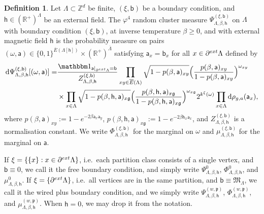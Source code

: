 \documentclass[11pt,a4paper]{article}
\theoremstyle{definition}
\newtheorem{definition}[theorem]{Definition}
\numberwithin{equation}{section}
\newcommand\fg{\mathfrak{g}}
\begin{document}
\begin{definition} \label{def: random cluster phi4}
Let $\Lambda \subset \mathbb Z^d$ be finite, $(\xi,\mathsf{b})$ be a boundary condition, and $\mathsf h\in (\mathbb R^+)^{\Lambda}$ be an external field. The $\varphi^4$ random cluster measure $\Psi_{\Lambda,\beta,\mathsf{h}}^{(\xi,\mathsf{b})}$ on $\Lambda$ with boundary condition $(\xi,\mathsf{b})$, at inverse temperature $\beta\geq 0$, and with external magnetic field $\mathsf{h}$ is the probability measure on pairs $(\omega,\mathsf{a})\in \{0,1\}^{\overline E(\Lambda[\mathsf{h}])}\times (\mathbb R^+)^{\overline{\Lambda}}$ satisfying $\mathsf{a}_x=\mathsf{b}_x$ for all $x\in \partial^{\rm ext} \Lambda$ defined by
\begin{equation}\label{eq: random cluster explicit density}
\begin{aligned}
\mathrm{d}\Psi_{\Lambda,\beta,\mathsf{h}}^{(\xi,\mathsf{b})}[(\omega,\mathsf{a})]=&\frac{\mathbbm 1_{\mathsf{a}|_{\partial^{{\rm ext}}\Lambda} = \mathsf b}}{Z^{(\xi,\mathsf{b})}_{\Lambda,\beta,\mathsf{h}}}\prod_{xy \in \overline{E}(\Lambda)} \sqrt{1-p(\beta,\mathsf a)_{xy}}\Big(\frac{p(\beta,\mathsf a)_{xy}}{1-p(\beta,\mathsf a)_{xy}}\Big)^{\omega_{xy}} \, \\
& \times \prod_{x\in \Lambda} \sqrt{1-p(\beta, \mathsf h, \mathsf a)_{x\fg}}\Big(\frac{p(\beta, \mathsf{h}, \mathsf a)_{x\fg}}{1-p(\beta,\mathsf{h}, \mathsf a)_{x\fg}}\Big)^{\omega_{x\fg}} 2^{k^\xi(\omega)} 
\prod_{x\in \Lambda}\mathrm{d} \rho_{g,a}(\mathsf{a}_x),
\end{aligned}
\end{equation}
where $p(\beta, \mathsf a)_{xy}:=1-e^{-2\beta \mathsf a_x \mathsf a_y}$, $p(\beta,\mathsf{h}, \mathsf a)_{x\fg}:=1-e^{-2\beta \mathsf h_x \mathsf a_x}$, and $Z^{(\xi,\mathsf{b})}_{\Lambda,\beta,\mathsf{h}}$ is a normalisation constant. We write $\Phi^{(\xi,\mathsf b)}_{\Lambda,\beta,\mathsf{h}}$ for the marginal on $\omega$ and $\mu_{\Lambda,\beta,\mathsf h}^{(\xi,\mathsf b)}$ for the marginal on $\mathsf a$.

If $\xi=\{\{x\}: x\in \partial^{\rm ext} \Lambda\}$, i.e.\ each partition class consists of a single vertex,
and $\mathsf{b}\equiv 0$, we call it the {free boundary condition}, and simply write $\Psi_{\Lambda,\beta,\mathsf{h}}^{0}$, $\Phi^{0}_{\Lambda,\beta,\mathsf{h}}$,  and $\mu_{\Lambda,\beta,\mathsf{h}}^{0}$. If $\xi=\{ \partial^{\rm ext} \Lambda\}$, i.e.\ all vertices are in the same partition,
and $\mathsf b \equiv \mathfrak M_{\Lambda}$, we call it the {wired plus boundary condition}, and we simply write $\Psi_{\Lambda,\beta,\mathsf{h}}^{(w,\mathfrak{p})}$, $\Phi^{(w,\mathfrak{p})}_{\Lambda,\beta,\mathsf{h}}$, and $\mu_{\Lambda,\beta,\mathsf{h}}^{(w,\mathfrak{p})}$. When $\mathsf{h}=0$, we may drop it from the notation.
\end{definition}
\end{document}
